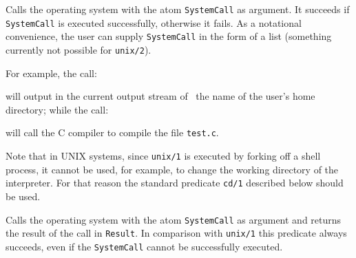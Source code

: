 \begin{description}
%

    Calls the operating system with the atom {\tt SystemCall} as argument.
    It succeeds if {\tt SystemCall} is executed successfully, otherwise it
    fails.  As a notational convenience, the user can supply {\tt SystemCall} 
    in the form of a list (something currently not possible for {\tt unix/2}).

    For example, the call:


    \noindent
    will output in the current output stream of \ourprolog\ the name of
    the user's home directory; while the call:


    \noindent
    will call the C compiler to compile the file {\tt test.c}.

    Note that in UNIX systems, since {\tt unix/1} is executed by
    forking off a shell process, it cannot be used, for example, to
    change the working directory of the interpreter.  For that reason
    the standard predicate {\tt cd/1} described below should be used.


    Calls the operating system with the atom {\tt SystemCall} as argument
    and returns the result of the call in {\tt Result}.  In comparison with
    {\tt unix/1} this predicate always succeeds, even if the {\tt SystemCall} 
    cannot be successfully executed.


\end{description}
